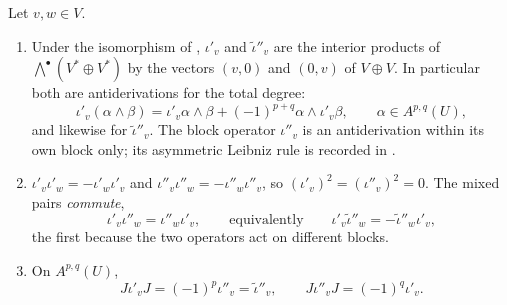 \begin{lemma}
\label{lem:ch09-contraction-basic}
Let $v,w\in V$.
\begin{enumerate}
\item Under the isomorphism of , $\iota'_v$
  and $\widetilde\iota''_v$ are the interior products of
  $\bigwedge^\bullet(V^*\oplus V^*)$ by the vectors $(v,0)$ and $(0,v)$ of
  $V\oplus V$.  In particular both are antiderivations for the total degree:
  \[
   \iota'_v(\alpha\wedge\beta)
   =\iota'_v\alpha\wedge\beta+(-1)^{p+q}\alpha\wedge\iota'_v\beta,
   \qquad\alpha\in A^{p,q}(U),
  \]
  and likewise for $\widetilde\iota''_v$.  The block operator $\iota''_v$ is
  an antiderivation within its own block only; its asymmetric Leibniz rule is
  recorded in .
\item $\iota'_v\iota'_w=-\iota'_w\iota'_v$ and
  $\iota''_v\iota''_w=-\iota''_w\iota''_v$, so
  $(\iota'_v)^2=(\iota''_v)^2=0$.  The mixed pairs \emph{commute},
  \[
   \iota'_v\iota''_w=\iota''_w\iota'_v ,
   \qquad\text{equivalently}\qquad
   \iota'_v\widetilde\iota''_w=-\widetilde\iota''_w\iota'_v ,
  \]
  the first because the two operators act on different blocks.
\item On $A^{p,q}(U)$,
  \[
   J\iota'_vJ=(-1)^p\iota''_v=\widetilde\iota''_v,
   \qquad
   J\iota''_vJ=(-1)^q\iota'_v .
  \]
\end{enumerate}
\end{lemma}


